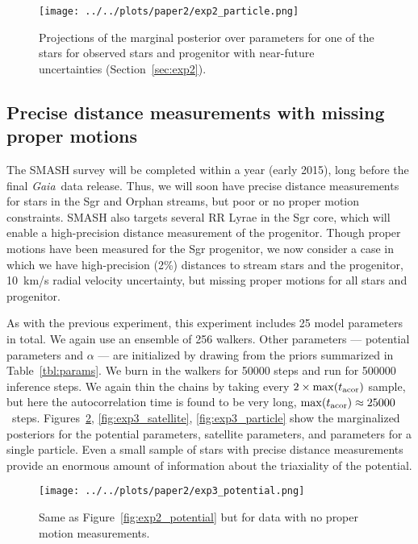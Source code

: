 \documentclass[letterpaper,12pt,preprint]{aastex}
\newcommand{\project}[1]{\textsl{#1}}
\newcommand{\gaia}{\project{Gaia}}
\newcommand{\Loffset}{\alpha}
\begin{document}
\begin{figure}[!ht]
\begin{center}
\texttt{[image: ../../plots/paper2/exp2\_particle.png]}
\caption{ Projections of the marginal posterior over parameters for one of the stars for observed stars and progenitor with near-future uncertainties (Section~\ref{sec:exp2}).   }\label{fig:exp2_particle}
\end{center}
\end{figure}

\subsection{Precise distance measurements with missing proper motions}\label{sec:exp3}
The SMASH survey \citep{smashprop} will be completed within a year (early 2015), long before the final \gaia\, data release. Thus, we will soon have precise distance measurements for stars in the Sgr and Orphan streams, but poor or no proper motion constraints. SMASH also targets several RR Lyrae in the Sgr core, which will enable a high-precision distance measurement of the progenitor. Though proper motions have been measured for the Sgr progenitor, we now consider a case in which we have high-precision (2\%) distances to stream stars and the progenitor, 10~km/s radial velocity uncertainty, but missing proper motions for all stars and progenitor. 

As with the previous experiment, this experiment includes 25 model parameters in total. We again use an ensemble of 256 walkers. Other parameters --- potential parameters and $\Loffset$ --- are initialized by drawing from the priors summarized in Table~\ref{tbl:params}. We burn in the walkers for 50000 steps and run for 500000 inference steps. We again thin the chains by taking every $2\times \max(t_{\rm acor})$ sample, but here the autocorrelation time is found to be very long, $\max(t_{\rm acor}) \approx 25000$~steps. Figures~\ref{fig:exp3_potential}, \ref{fig:exp3_satellite}, \ref{fig:exp3_particle} show the marginalized posteriors for the potential parameters, satellite parameters, and parameters for a single particle. Even a small sample of stars with precise distance measurements provide an enormous amount of information about the triaxiality of the potential.

\begin{figure}[!ht]
\begin{center}
\texttt{[image: ../../plots/paper2/exp3\_potential.png]}
\caption{ Same as Figure~\ref{fig:exp2_potential} but for data with no proper motion measurements. }\label{fig:exp3_potential}
\end{center}
\end{figure}
\end{document}
